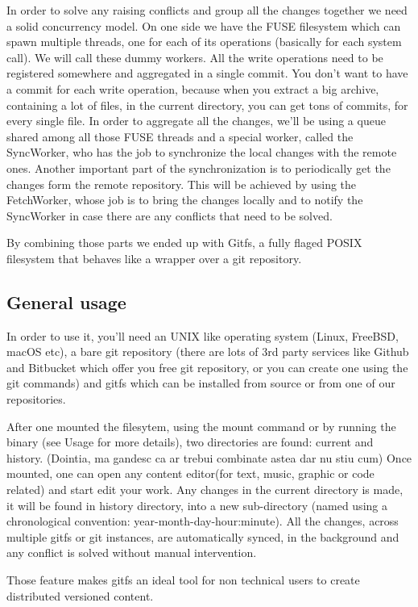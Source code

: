 In order to solve any raising conflicts and group all the changes together we need a solid concurrency model. On one side we have the FUSE filesystem which can spawn multiple threads, one for each of its operations (basically for each system call). We will call these dummy workers. All the write operations need to be registered somewhere and aggregated in a single commit. You don't want to have a commit for each write operation, because when you extract a big archive, containing a lot of files, in the current directory, you can get tons of commits, for every single file. In order to aggregate all the changes, we'll be using a queue shared among all those FUSE threads and a special worker, called the SyncWorker, who has the job to synchronize the local changes with the remote ones. Another important part of the synchronization is to periodically get the changes form the remote repository. This will be achieved by using the FetchWorker, whose job is to bring the changes locally and to notify the SyncWorker in case there are any conflicts that need to be solved.

By combining those parts we ended up with Gitfs, a fully flaged POSIX filesystem that behaves like a wrapper over a git repository.

\subsection{General usage}
In order to use it, you'll need an UNIX like operating system (Linux, FreeBSD, macOS etc), a bare git repository (there are lots of 3rd party services like Github and Bitbucket which offer you free git repository, or you can create one using the git commands) and gitfs which can be installed from source or from one of our repositories.

After one mounted the filesytem, using the mount command or by running the binary (see Usage for more details), two directories are found: current and history. (Dointia, ma gandesc ca ar trebui combinate astea dar nu stiu cum) Once mounted, one can open any content editor(for text, music, graphic or code related) and start edit your work. Any changes in the current directory is made, it will be found in history directory, into a new sub-directory (named using a chronological convention: year-month-day-hour:minute). All the changes, across multiple gitfs or git instances, are automatically synced, in the background and any conflict is solved without manual intervention.

Those feature makes gitfs an ideal tool for non technical users to create distributed versioned content.

